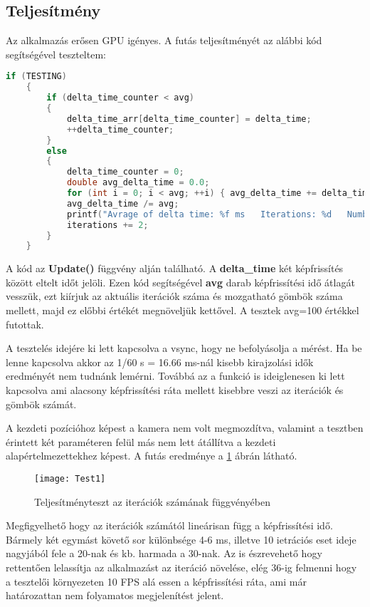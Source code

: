 \subsection{Teljesítmény}

Az alkalmazás erősen GPU igényes.  A futás teljesítményét az alábbi kód segítségével teszteltem:
\begin{lstlisting}[language={C++}]
if (TESTING)
	{
		if (delta_time_counter < avg)
		{
			delta_time_arr[delta_time_counter] = delta_time;
			++delta_time_counter;
		}
		else
		{
			delta_time_counter = 0;
			double avg_delta_time = 0.0;
			for (int i = 0; i < avg; ++i) { avg_delta_time += delta_time_arr[i]; }
			avg_delta_time /= avg;
			printf("Avrage of delta time: %f ms   Iterations: %d   Number of spheres: %d \n", avg_delta_time*1000, iterations, ballCount);
			iterations += 2;
		}
	}
\end{lstlisting}

A kód az \textbf{Update()} függvény alján található. A \textbf{delta\_time} két képfrissítés között eltelt időt jelöli. Ezen kód segítségével \textbf{avg} darab képfrissítési idő átlagát vesszük, ezt kiírjuk az aktuális iterációk száma és mozgatható gömbök száma mellett, majd ez előbbi értékét megnöveljük kettővel. A tesztek avg=100 értékkel futottak.

A tesztelés idejére ki lett kapcsolva a vsync, hogy ne befolyásolja a mérést. Ha be lenne kapcsolva akkor az 1/60 s = 16.66 ms-nál kisebb kirajzolási idők eredményét nem tudnánk lemérni. Továbbá az a funkció is ideiglenesen ki lett kapcsolva ami alacsony képfrissítési ráta mellett kisebbre veszi az iterációk és gömbök számát.

A kezdeti pozícióhoz képest a kamera nem volt megmozdítva, valamint a tesztben érintett két paraméteren felül más nem lett átállítva a kezdeti alapértelmezettekhez képest. A futás eredménye a \ref{fig:Test1} ábrán látható.

\begin{figure}[H]
	\centering
	\texttt{[image: Test1]}
	\caption{Teljesítményteszt az iterációk számának függvényében}
	\label{fig:Test1}
\end{figure}

Megfigyelhető hogy az iterációk számától lineárisan függ a képfrissítési idő. Bármely két egymást követő sor különbsége 4-6 ms, illetve 10 ietrációs eset ideje nagyjából fele a 20-nak és kb. harmada a 30-nak. Az is észrevehető hogy rettentően lelassítja az alkalmazást az iteráció növelése, elég 36-ig felmenni hogy a tesztelői környezeten 10 FPS alá essen a képfrissítési ráta, ami már határozattan nem folyamatos megjelenítést jelent.

